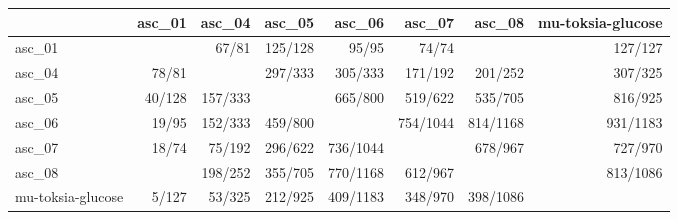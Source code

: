\begin{tabular}{lrrrrrrr}
\toprule
 & asc_01 & asc_04 & asc_05 & asc_06 & asc_07 & asc_08 & mu-toksia-glucose \\
\midrule
asc_01 &  & 67/81 & 125/128 & 95/95 & 74/74 &  & 127/127 \\
asc_04 & 78/81 &  & 297/333 & 305/333 & 171/192 & 201/252 & 307/325 \\
asc_05 & 40/128 & 157/333 &  & 665/800 & 519/622 & 535/705 & 816/925 \\
asc_06 & 19/95 & 152/333 & 459/800 &  & 754/1044 & 814/1168 & 931/1183 \\
asc_07 & 18/74 & 75/192 & 296/622 & 736/1044 &  & 678/967 & 727/970 \\
asc_08 &  & 198/252 & 355/705 & 770/1168 & 612/967 &  & 813/1086 \\
mu-toksia-glucose & 5/127 & 53/325 & 212/925 & 409/1183 & 348/970 & 398/1086 &  \\
\bottomrule
\end{tabular}

